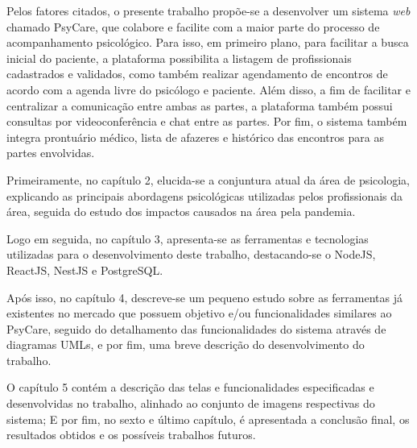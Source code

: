 Pelos fatores citados, o presente trabalho propõe-se a desenvolver um sistema \textit{web} chamado PsyCare, que colabore e facilite com a maior parte do processo de acompanhamento psicológico. Para isso, em primeiro plano, para facilitar a busca inicial do paciente, a plataforma possibilita a listagem de profissionais cadastrados e validados, como também realizar agendamento de encontros de acordo com a agenda livre do psicólogo e paciente. Além disso, a fim de facilitar e centralizar a comunicação entre ambas as partes, a plataforma também possui consultas por videoconferência e chat entre as partes. Por fim, o sistema também integra prontuário médico, lista de afazeres e histórico das encontros para as partes envolvidas.

Primeiramente, no capítulo 2, elucida-se a conjuntura atual da área de psicologia, explicando as principais abordagens psicológicas utilizadas pelos profissionais da área, seguida do estudo dos impactos causados na área pela pandemia.

Logo em seguida, no capítulo 3, apresenta-se as ferramentas e tecnologias utilizadas para o desenvolvimento deste trabalho, destacando-se o NodeJS, ReactJS, NestJS e PostgreSQL.

Após isso, no capítulo 4, descreve-se um pequeno estudo sobre as ferramentas já existentes no mercado que possuem objetivo e/ou funcionalidades similares ao PsyCare, seguido do detalhamento das funcionalidades do sistema através de diagramas UMLs, e por fim, uma breve descrição do desenvolvimento do trabalho.

O capítulo 5 contém a descrição das telas e funcionalidades especificadas e desenvolvidas no trabalho, alinhado ao conjunto de imagens respectivas do sistema; E por fim, no sexto e último capítulo, é apresentada a conclusão final, os resultados obtidos e os possíveis trabalhos futuros.

